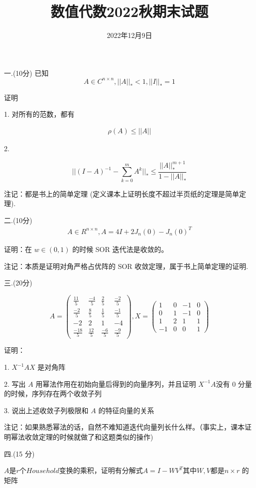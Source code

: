 \documentclass{article}
\title{数值代数2022秋期末试题}
\author{2022年12月9日}
\date{}
\begin{document}
	\maketitle
一.(10分) 已知
$$
A\in C^{n\times n},||A||_*<1,||I||_*=1
$$

证明

1. 对所有的范数，都有

$$
\begin{aligned}\rho(A)\leq||A||\end{aligned}
$$

2.

$$||(I-A)^{-1}-\sum_{k=0}^mA^k||_*\leq\frac{||A||_*^{m+1}}{1-||A||_*}$$

注记：都是书上的简单定理 (定义课本上证明长度不超过半页纸的定理是简单定理).

二.(10分)
$$
\begin{aligned}A\in R^{n\times n},A=4I+2J_n(0)-J_n(0)^T\end{aligned}
$$

证明：在 $w\in(0,1)$ 的时候 SOR 迭代法是收敛的。

注记：本质是证明对角严格占优阵的 SOR 收敛定理，属于书上简单定理的证明.

三.(20分)

$$A=\begin{pmatrix}\frac{11}{5}&\frac{-4}{5}&\frac{2}{5}&\frac{-2}{5}\\\frac{-2}{5}&\frac{8}{5}&\frac{1}{5}&\frac{-1}{5}\\-2&2&1&-4\\\frac{-18}{5}&\frac{12}{5}&\frac{-6}{5}&\frac{-9}{5}\end{pmatrix},X=\begin{pmatrix}1&0&-1&0\\0&1&-1&0\\1&2&1&1\\-1&0&0&1\end{pmatrix}$$

证明：

1. $X^{-1}AX$ 是对角阵

2. 写出 $A$ 用幂法作用在初始向量后得到的向量序列，并且证明 $X^{-1}A$没有 $0$ 分量的时候，序列存在两个收敛子列

3. 说出上述收敛子列极限和 $A$ 的特征向量的关系

注记：如果熟悉幂法的话，自然不难知道迭代向量列长什么样。（事实上，课本证明幂法收敛定理的时候就做了和这题类似的操作)

四.(15 分) 


$A$是$r$个$Household$变换的乘积，证明有分解式$A=I-WV^T$其中$ W,V $都是$ n×r$ 的矩阵 
\end{document}
